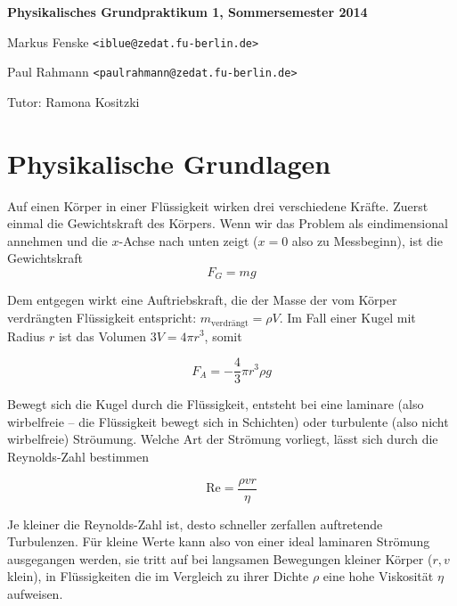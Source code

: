 \documentclass[a4paper,german,12pt,smallheadings]{scrartcl}
\begin{document}
\allowdisplaybreaks %
\begin{center}
\bfseries %
\sffamily %
\vspace{-40pt}
Physikalisches Grundpraktikum 1, Sommersemester 2014

Markus Fenske \texttt{<iblue@zedat.fu-berlin.de>}

Paul Rahmann \texttt{<paulrahmann@zedat.fu-berlin.de>}

Tutor: Ramona Kositzki
\vspace{-10pt}
\end{center}

\section*{Physikalische Grundlagen}

Auf einen Körper in einer Flüssigkeit wirken drei verschiedene Kräfte. Zuerst
einmal die Gewichtskraft des Körpers. Wenn wir das Problem als eindimensional
annehmen und die $x$-Achse nach unten zeigt ($x = 0$ also zu Messbeginn), ist
die Gewichtskraft
\begin{equation}
  F_G = mg
\end{equation}

Dem entgegen wirkt eine Auftriebskraft, die der Masse der vom Körper verdrängten
Flüssigkeit entspricht: $m_\text{verdrängt} = \rho V$. Im Fall einer Kugel mit
Radius $r$ ist das Volumen $3V = 4 \pi r^3$, somit

\begin{equation}
  F_A = -\frac{4}{3} \pi r^3 \rho g
\end{equation}

Bewegt sich die Kugel durch die Flüssigkeit, entsteht bei eine laminare (also
wirbelfreie -- die Flüssigkeit bewegt sich in Schichten) oder turbulente (also
nicht wirbelfreie) Ströumung. Welche Art der Strömung vorliegt, lässt sich
durch die Reynolds-Zahl bestimmen

\begin{equation}
  \text{Re} = \frac{\rho v r}{\eta}
\end{equation}

Je kleiner die Reynolds-Zahl ist, desto schneller zerfallen auftretende
Turbulenzen. Für kleine Werte kann also von einer ideal laminaren Strömung
ausgegangen werden, sie tritt auf bei langsamen Bewegungen kleiner Körper
($r,v$ klein), in Flüssigkeiten die im Vergleich zu ihrer Dichte $\rho$ eine
hohe Viskosität $\eta$ aufweisen.
\end{document}
